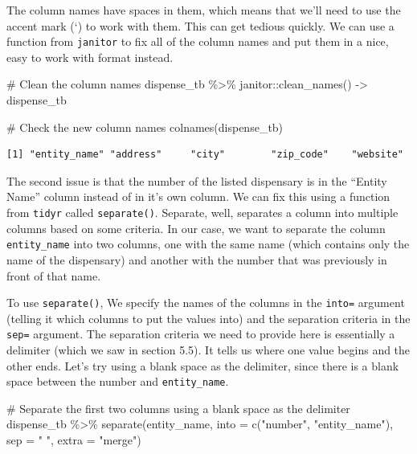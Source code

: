\documentclass[
  letterpaper,
]{book}
\newenvironment{Shaded}{\begin{snugshade}}{\end{snugshade}}
\newcommand{\AttributeTok}[1]{\textcolor[rgb]{0.40,0.45,0.13}{#1}}
\newcommand{\CommentTok}[1]{\textcolor[rgb]{0.37,0.37,0.37}{#1}}
\newcommand{\FunctionTok}[1]{\textcolor[rgb]{0.28,0.35,0.67}{#1}}
\newcommand{\NormalTok}[1]{\textcolor[rgb]{0.00,0.23,0.31}{#1}}
\newcommand{\OtherTok}[1]{\textcolor[rgb]{0.00,0.23,0.31}{#1}}
\newcommand{\SpecialCharTok}[1]{\textcolor[rgb]{0.37,0.37,0.37}{#1}}
\newcommand{\StringTok}[1]{\textcolor[rgb]{0.13,0.47,0.30}{#1}}
\begin{document}
The column names have spaces in them, which means that we'll need to use
the accent mark (`) to work with them. This can get tedious quickly. We
can use a function from \texttt{janitor} to fix all of the column names
and put them in a nice, easy to work with format instead.

\begin{Shaded}
\begin{Highlighting}[]
\CommentTok{\# Clean the column names}
\NormalTok{dispense\_tb }\SpecialCharTok{\%\textgreater{}\%}
\NormalTok{  janitor}\SpecialCharTok{::}\FunctionTok{clean\_names}\NormalTok{() }\OtherTok{{-}\textgreater{}}\NormalTok{ dispense\_tb}

\CommentTok{\# Check the new column names}
\FunctionTok{colnames}\NormalTok{(dispense\_tb)}
\end{Highlighting}
\end{Shaded}

\begin{verbatim}
[1] "entity_name" "address"     "city"        "zip_code"    "website"    
\end{verbatim}

The second issue is that the number of the listed dispensary is in the
``Entity Name'' column instead of in it's own column. We can fix this
using a function from \texttt{tidyr} called \texttt{separate()}.
Separate, well, separates a column into multiple columns based on some
criteria. In our case, we want to separate the column
\texttt{entity\_name} into two columns, one with the same name (which
contains only the name of the dispensary) and another with the number
that was previously in front of that name.

To use \texttt{separate()}, We specify the names of the columns in the
\texttt{into=} argument (telling it which columns to put the values
into) and the separation criteria in the \texttt{sep=} argument. The
separation criteria we need to provide here is essentially a delimiter
(which we saw in section 5.5). It tells us where one value begins and
the other ends. Let's try using a blank space as the delimiter, since
there is a blank space between the number and \texttt{entity\_name}.

\begin{Shaded}
\begin{Highlighting}[]
\CommentTok{\# Separate the first two columns using a blank space as the delimiter}
\NormalTok{dispense\_tb }\SpecialCharTok{\%\textgreater{}\%}
  \FunctionTok{separate}\NormalTok{(entity\_name,}
           \AttributeTok{into =} \FunctionTok{c}\NormalTok{(}\StringTok{"number"}\NormalTok{, }\StringTok{"entity\_name"}\NormalTok{), }
           \AttributeTok{sep =} \StringTok{" "}\NormalTok{, }
           \AttributeTok{extra =} \StringTok{"merge"}\NormalTok{)}
\end{Highlighting}
\end{Shaded}
\end{document}
